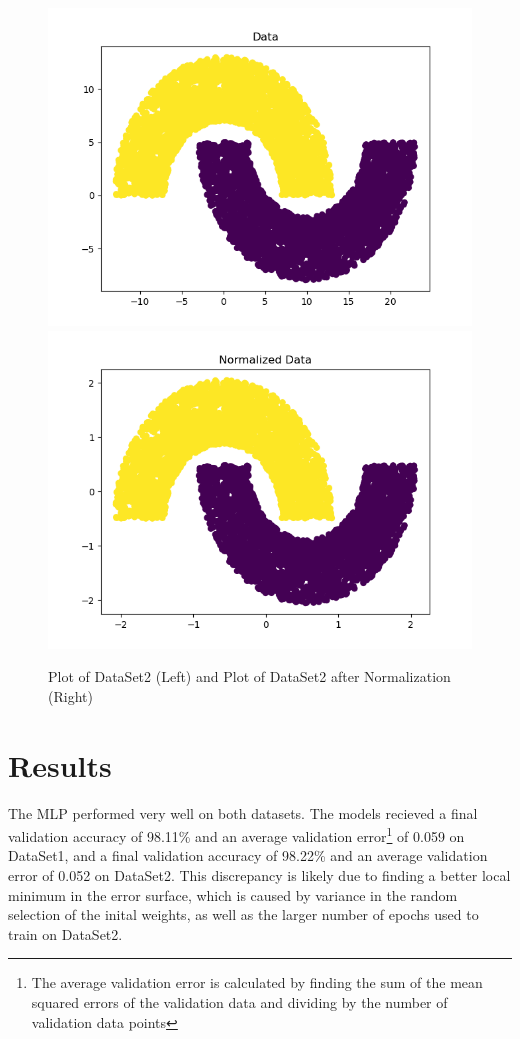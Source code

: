 \documentclass[letterpaper, 12pt]{article}
\begin{document}
\begin{figure}
\centering
\includegraphics[scale = 0.5]{DataSet2Plot}
\includegraphics[scale = 0.5]{DataSet2NormalizedPlot}
\caption{Plot of DataSet2 (Left) and Plot of DataSet2 after Normalization (Right)}
\end{figure}

\section{Results}

The MLP performed very well on both datasets. The models recieved a final validation accuracy of 98.11\% and an average validation error\footnote{The average validation error is calculated by finding the sum of the mean squared errors of the validation data and dividing by the number of validation data points} of 0.059 on DataSet1, and a final validation accuracy of 98.22\% and an average validation error of 0.052 on DataSet2. This discrepancy is likely due to finding a better local minimum in the error surface, which is caused by variance in the random selection of the inital weights, as well as the larger number of epochs used to train on DataSet2.
\end{document}
